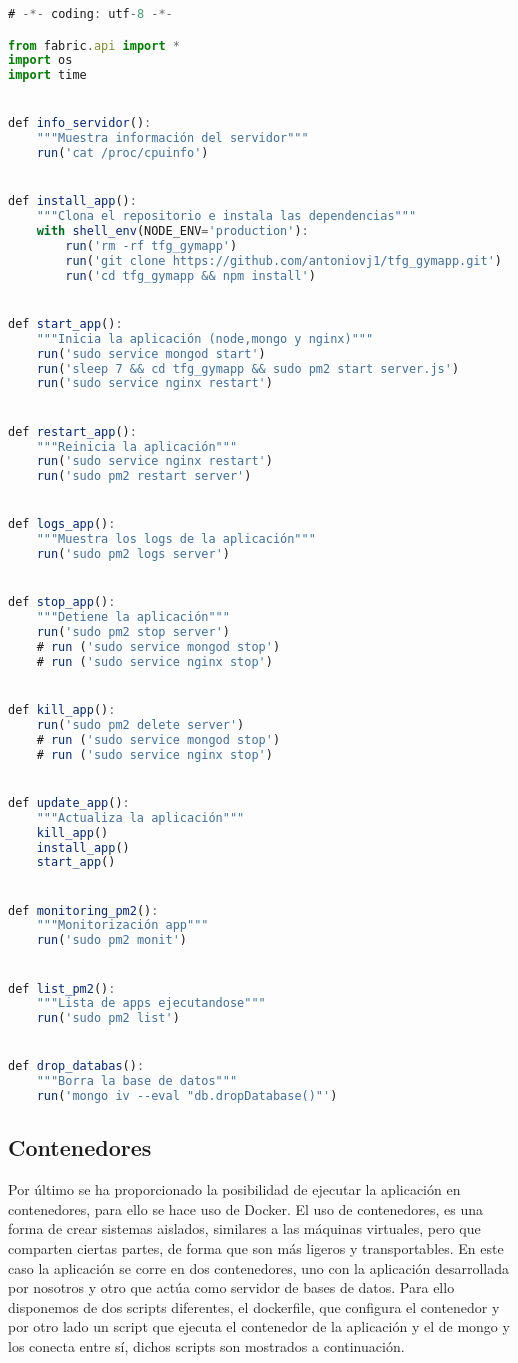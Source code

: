 \begin{lstlisting}[language=javascript,caption={Test Unitarios},label={lst:appjs}]
# -*- coding: utf-8 -*-

from fabric.api import *
import os
import time


def info_servidor():
    """Muestra información del servidor"""
    run('cat /proc/cpuinfo')


def install_app():
    """Clona el repositorio e instala las dependencias"""
    with shell_env(NODE_ENV='production'):
        run('rm -rf tfg_gymapp')
        run('git clone https://github.com/antoniovj1/tfg_gymapp.git')
        run('cd tfg_gymapp && npm install')


def start_app():
    """Inicia la aplicación (node,mongo y nginx)"""
    run('sudo service mongod start')
    run('sleep 7 && cd tfg_gymapp && sudo pm2 start server.js')
    run('sudo service nginx restart')


def restart_app():
    """Reinicia la aplicación"""
    run('sudo service nginx restart')
    run('sudo pm2 restart server')


def logs_app():
    """Muestra los logs de la aplicación"""
    run('sudo pm2 logs server')


def stop_app():
    """Detiene la aplicación"""
    run('sudo pm2 stop server')
    # run ('sudo service mongod stop')
    # run ('sudo service nginx stop')


def kill_app():
    run('sudo pm2 delete server')
    # run ('sudo service mongod stop')
    # run ('sudo service nginx stop')


def update_app():
    """Actualiza la aplicación"""
    kill_app()
    install_app()
    start_app()


def monitoring_pm2():
    """Monitorización app"""
    run('sudo pm2 monit')


def list_pm2():
    """Lista de apps ejecutandose"""
    run('sudo pm2 list')


def drop_databas():
    """Borra la base de datos"""
    run('mongo iv --eval "db.dropDatabase()"')
\end{lstlisting}

\subsection {Contenedores}
Por último se ha proporcionado la posibilidad de ejecutar la aplicación en contenedores, para ello se hace uso de Docker. El uso de contenedores, es una forma de crear sistemas aislados, similares a las máquinas virtuales, pero que comparten ciertas partes, de forma que son más ligeros y transportables. En este caso la aplicación se corre en dos contenedores, uno con la aplicación desarrollada por nosotros y otro que actúa como servidor de bases de datos. Para ello disponemos de dos scripts diferentes, el dockerfile, que configura el contenedor y por otro lado un script que ejecuta el contenedor de la aplicación y el de mongo y los conecta entre sí, dichos scripts son mostrados a continuación.

